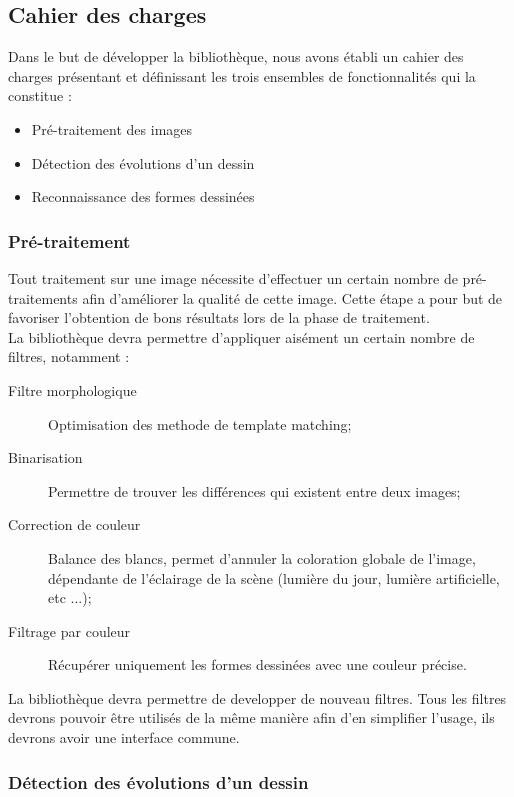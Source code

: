 \subsection{Cahier des charges}

Dans le but de développer la bibliothèque, nous avons établi un cahier des charges présentant et définissant les trois ensembles de fonctionnalités qui la constitue :
\begin{itemize}
\item Pré-traitement des images
\item Détection des évolutions d'un dessin
\item Reconnaissance des formes dessinées
\end{itemize}

\subsubsection{Pré-traitement}

Tout traitement sur une image nécessite d'effectuer un certain nombre de pré-traitements afin d'améliorer la qualité de cette image. Cette étape a pour but de favoriser l'obtention de bons résultats lors de la phase de traitement.\\

La bibliothèque devra permettre d'appliquer aisément un certain nombre de filtres, notamment :

\begin{description}
\item[Filtre morphologique] Optimisation des methode de template matching;
\item[Binarisation] Permettre de trouver les différences qui existent entre deux images;
\item[Correction de couleur] Balance des blancs, permet d'annuler la coloration globale de l'image, dépendante de l'éclairage de la scène (lumière du jour, lumière artificielle, etc ...);
\item[Filtrage par couleur] Récupérer uniquement les formes dessinées avec une couleur précise.
\end{description}

La bibliothèque devra permettre de developper de nouveau filtres. Tous les filtres devrons pouvoir être utilisés de la même manière afin d'en simplifier l'usage, ils devrons avoir une interface commune.

\clearpage
\subsubsection{Détection des évolutions d'un dessin}

